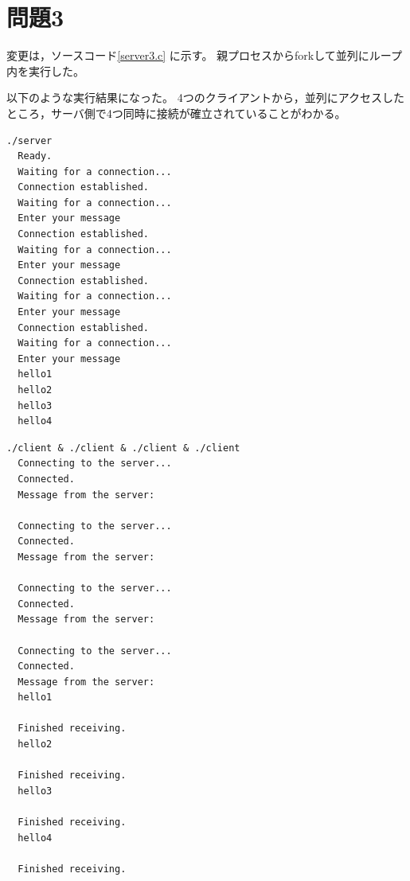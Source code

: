 \documentclass[a4paper,10pt]{jsarticle}
\begin{document}
\section{問題3}
変更は，ソースコード\ref{server3.c} に示す。
親プロセスからforkして並列にループ内を実行した。

以下のような実行結果になった。
4つのクライアントから，並列にアクセスしたところ，サーバ側で4つ同時に接続が確立されていることがわかる。

\begin{lstlisting}[caption={server3},label={server3}]
  ./server
  Ready.
  Waiting for a connection...
  Connection established.
  Waiting for a connection...
  Enter your message
  Connection established.
  Waiting for a connection...
  Enter your message
  Connection established.
  Waiting for a connection...
  Enter your message
  Connection established.
  Waiting for a connection...
  Enter your message
  hello1
  hello2
  hello3
  hello4  
\end{lstlisting}

\begin{lstlisting}[caption={client3},label={client3-1}]
  ./client & ./client & ./client & ./client
  Connecting to the server...
  Connected.
  Message from the server:
  
  Connecting to the server...
  Connected.
  Message from the server:
  
  Connecting to the server...
  Connected.
  Message from the server:
  
  Connecting to the server...
  Connected.
  Message from the server:
  hello1
  
  Finished receiving.
  hello2
  
  Finished receiving.
  hello3
  
  Finished receiving.
  hello4
  
  Finished receiving.  
\end{lstlisting}
\end{document}
